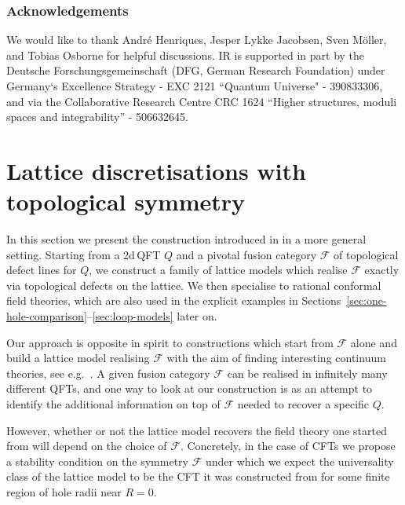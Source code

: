 \documentclass[11pt,a4paper]{article}
\numberwithin{equation}{section}
\begin{document}
\subsubsection*{Acknowledgements}

We would like to thank Andr\'e Henriques, Jesper Lykke Jacobsen, Sven Möller, and Tobias Osborne for helpful discussions.
%
IR is supported in part by the Deutsche Forschungsgemeinschaft (DFG, German Research Foundation) under Germany`s Excellence Strategy - EXC 2121 ``Quantum Universe" - 390833306, and via the Collaborative Research Centre CRC 1624 ``Higher structures, moduli spaces and integrability'' - 506632645.

\newpage

\section{Lattice discretisations with topological symmetry}\label{sec:lattice-construction}

In this section we present the construction introduced in \cite{Brehm:2021wev} in a more general setting. Starting from a 2d\,QFT $Q$ and a pivotal fusion category $\mathcal{F}$ of topological defect lines for $Q$, we construct a family of lattice models which realise  $\mathcal{F}$ exactly via topological defects on the lattice. We then specialise to rational conformal field theories, which are also used in the explicit examples in Sections~\ref{sec:one-hole-comparison}--\ref{sec:loop-models} later on. 

Our approach is opposite in spirit to constructions which start from $\mathcal{F}$ alone and build a lattice model realising $\mathcal{F}$ with the aim of finding interesting continuum theories, see e.g.\ \cite{PhysRevLett.98.160409,Kitaev:2011dxc,Vanhove:2018wlb,Lootens:2020mso,Aasen:2020jwb,Huang:2021nvb,Vanhove:2021zop}. A given fusion category $\mathcal{F}$ can be realised in infinitely many different QFTs, and one way to look at our construction is as an attempt to identify the additional information on top of $\mathcal{F}$ needed to recover a specific $Q$. 

However, whether or not the lattice model recovers the field theory one started from will depend on the choice of $\mathcal{F}$.
Concretely, in the case of CFTs we propose a stability condition on the symmetry $\mathcal{F}$ under which we expect the universality class of the lattice model to be the CFT it was constructed from for some finite region of hole radii near $R=0$.
\end{document}

